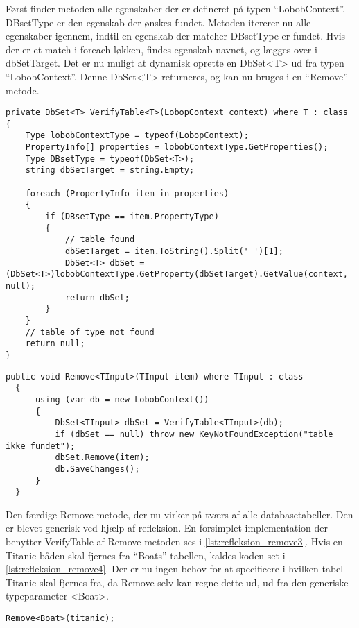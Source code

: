 Først finder metoden alle egenskaber der er defineret på typen \enquote{LobobContext}. DBsetType er den egenskab der ønskes fundet. Metoden itererer nu alle egenskaber igennem, indtil en egenskab der matcher DBsetType er fundet. Hvis der er et match i foreach løkken, findes egenskab navnet, og lægges over i dbSetTarget. Det er nu muligt at dynamisk oprette en DbSet<T> ud fra typen \enquote{LobobContext}. Denne DbSet<T> returneres, og kan nu bruges i en \enquote{Remove} metode.

\begin{lstlisting}[label=lst:refleksion_verifytable, caption={Metode der tjekker om en tabel af typen T findes i databasen.}]
private DbSet<T> VerifyTable<T>(LobopContext context) where T : class
{
    Type lobobContextType = typeof(LobopContext);
    PropertyInfo[] properties = lobobContextType.GetProperties();
    Type DBsetType = typeof(DbSet<T>);
    string dbSetTarget = string.Empty;

    foreach (PropertyInfo item in properties)
    {
        if (DBsetType == item.PropertyType)
        {
            // table found
            dbSetTarget = item.ToString().Split(' ')[1];
            DbSet<T> dbSet = (DbSet<T>)lobobContextType.GetProperty(dbSetTarget).GetValue(context, null);
            return dbSet;
        }
    }
    // table of type not found
    return null;
}
\end{lstlisting}

\begin{lstlisting}[label=lst:refleksion_remove3, caption={Remove metode der kan tage en vilkårlig klasse ind, finde den rette tabel og derefter slette det parametiserede objekt}]
  public void Remove<TInput>(TInput item) where TInput : class
  {
      using (var db = new LobobContext())
      {
          DbSet<TInput> dbSet = VerifyTable<TInput>(db);
          if (dbSet == null) throw new KeyNotFoundException("table ikke fundet");
          dbSet.Remove(item);
          db.SaveChanges();
      }
  } 
\end{lstlisting}

Den færdige Remove metode, der nu virker på tværs af alle databasetabeller. Den er blevet generisk ved hjælp af refleksion. En forsimplet implementation der benytter VerifyTable af Remove metoden ses i \cref{lst:refleksion_remove3}. Hvis en Titanic båden skal fjernes fra \enquote{Boats} tabellen, kaldes koden set i \cref{lst:refleksion_remove4}. Der er nu ingen behov for at specificere i hvilken tabel Titanic skal fjernes fra, da Remove selv kan regne dette ud, ud fra den generiske typeparameter <Boat>.

\begin{lstlisting}[label=lst:refleksion_remove4, caption={Eksempel på brugen af Remove metoden, der fjerner en båd.}]
Remove<Boat>(titanic);
\end{lstlisting}

